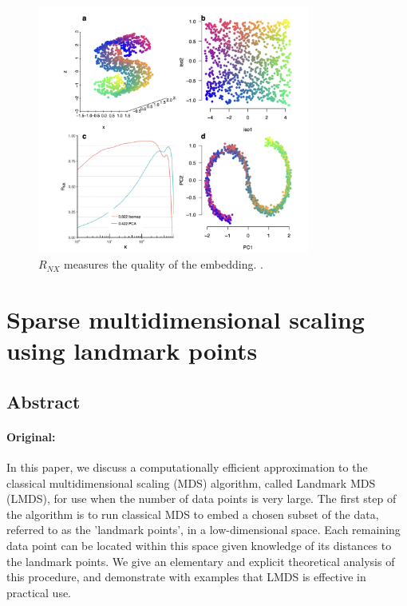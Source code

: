 \documentclass[a4paper,12pt]{article}
\begin{document}
\begin{figure}[ht]
    \centering
    \includegraphics[width=0.8\textwidth]{figures/dimRed_R_NX.png}
    \caption{$R_{NX}$ measures the quality of the embedding. \cite{Kraemer2018dimRedAC}.}
    \label{fig:dimRed_R_NX}
\end{figure}


\pagebreak
\section{Sparse multidimensional scaling
using landmark points \texorpdfstring{\cite{LMDS:2004}}{}}
\label{sec:LMDS:2004}

\subsection{Abstract}

\paragraph{Original:} In this paper, we discuss a computationally eﬃcient approximation to the classical multidimensional scaling (MDS) algorithm, called Landmark MDS (LMDS), for use when the number of data points is very large. The first step of the algorithm is to run classical MDS to embed a chosen subset of the data, referred to as the 'landmark points', in a low-dimensional space. Each remaining data point can be located within this space given knowledge of its distances to the landmark points. We give an elementary and explicit theoretical analysis of this procedure, and demonstrate with examples that LMDS is eﬀective in practical use.
\end{document}
